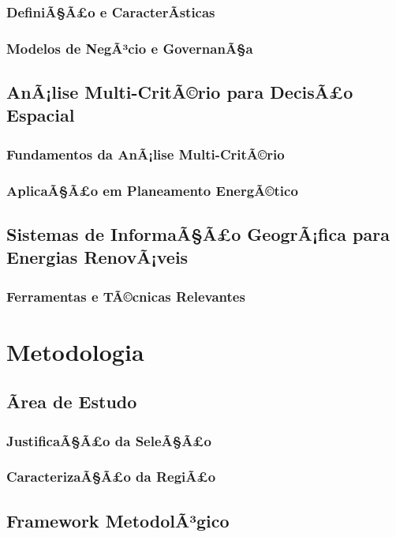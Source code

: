 \documentclass[12pt, a4paper]{article}
\begin{document}
\subsubsection{DefiniÃ§Ã£o e CaracterÃ­sticas}
\subsubsection{Modelos de NegÃ³cio e GovernanÃ§a}

\subsection{AnÃ¡lise Multi-CritÃ©rio para DecisÃ£o Espacial}
\subsubsection{Fundamentos da AnÃ¡lise Multi-CritÃ©rio}
\subsubsection{AplicaÃ§Ã£o em Planeamento EnergÃ©tico}

\subsection{Sistemas de InformaÃ§Ã£o GeogrÃ¡fica para Energias RenovÃ¡veis}
\subsubsection{Ferramentas e TÃ©cnicas Relevantes}

\section{Metodologia}
\subsection{Ãrea de Estudo}
\subsubsection{JustificaÃ§Ã£o da SeleÃ§Ã£o}
\subsubsection{CaracterizaÃ§Ã£o da RegiÃ£o}

\subsection{Framework MetodolÃ³gico}
\end{document}
